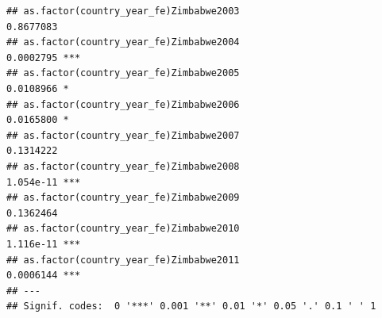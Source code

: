 \documentclass[
  a4paper,
]{article}
\begin{document}
\begin{verbatim}
## as.factor(country_year_fe)Zimbabwe2003                         0.8677083    
## as.factor(country_year_fe)Zimbabwe2004                         0.0002795 ***
## as.factor(country_year_fe)Zimbabwe2005                         0.0108966 *  
## as.factor(country_year_fe)Zimbabwe2006                         0.0165800 *  
## as.factor(country_year_fe)Zimbabwe2007                         0.1314222    
## as.factor(country_year_fe)Zimbabwe2008                         1.054e-11 ***
## as.factor(country_year_fe)Zimbabwe2009                         0.1362464    
## as.factor(country_year_fe)Zimbabwe2010                         1.116e-11 ***
## as.factor(country_year_fe)Zimbabwe2011                         0.0006144 ***
## ---
## Signif. codes:  0 '***' 0.001 '**' 0.01 '*' 0.05 '.' 0.1 ' ' 1
\end{verbatim}
\end{document}
